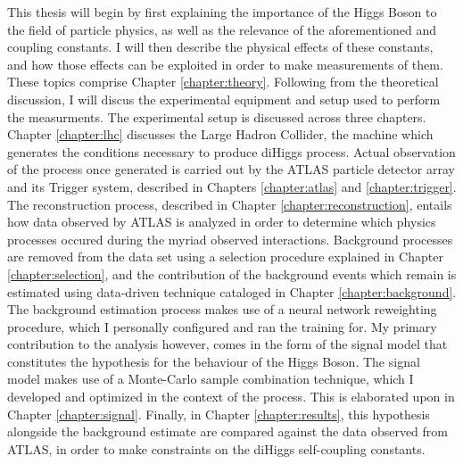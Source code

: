 This thesis will begin by first explaining the importance of the Higgs Boson to the field of particle physics,
    as well as the relevance of the aforementioned \kl and \kvv coupling constants.
I will then describe the physical effects of these constants,
    and how those effects can be exploited in order to make measurements of them.
These topics comprise Chapter \ref{chapter:theory}.
Following from the theoretical discussion, I will discus the experimental equipment and setup used to perform the  measurments.
The experimental setup is discussed across three chapters.
Chapter \ref{chapter:lhc} discusses the Large Hadron Collider, the machine which generates the conditions necessary to produce diHiggs process.
Actual observation of the process once generated is carried out by the ATLAS particle detector array and its Trigger system,
    described in Chapters \ref{chapter:atlas} and \ref{chapter:trigger}.
The reconstruction process, described in Chapter \ref{chapter:reconstruction},
    entails how data observed by ATLAS is analyzed in order to determine which physics processes occured during the myriad observed interactions.
Background processes are removed from the data set using a selection procedure explained in Chapter \ref{chapter:selection},
    and the contribution of the background events which remain is estimated using data-driven technique cataloged in Chapter \ref{chapter:background}. 
The background estimation process makes use of a neural network reweighting procedure, which I personally configured and ran the training for.
My primary contribution to the analysis however, comes in the form of the signal model that constitutes the hypothesis for the behaviour of the Higgs Boson.
The signal model makes use of a Monte-Carlo sample combination technique, which I developed and optimized in the context of the \vbfproc process.
This is elaborated upon in Chapter \ref{chapter:signal}.
Finally, in Chapter \ref{chapter:results}, this hypothesis alongside the background estimate are compared against the data observed from ATLAS,
    in order to make constraints on the diHiggs self-coupling constants.



%
